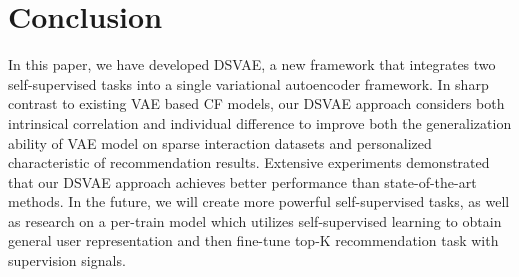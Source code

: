 \section{Conclusion}\label{sec5}
In this paper, we have developed DSVAE, a new framework that integrates  two self-supervised tasks into a single variational autoencoder framework. In sharp contrast to existing VAE based CF models, our DSVAE approach considers both intrinsical correlation and individual difference to improve both the generalization ability of VAE model on sparse interaction datasets  and  personalized characteristic of recommendation results. Extensive experiments demonstrated that our DSVAE approach achieves better performance than state-of-the-art methods. In the future, we will create more powerful self-supervised tasks, as well as research on a per-train model which  utilizes self-supervised learning to obtain general user representation and then fine-tune top-K recommendation task with supervision signals.










%
%

%



%
%



